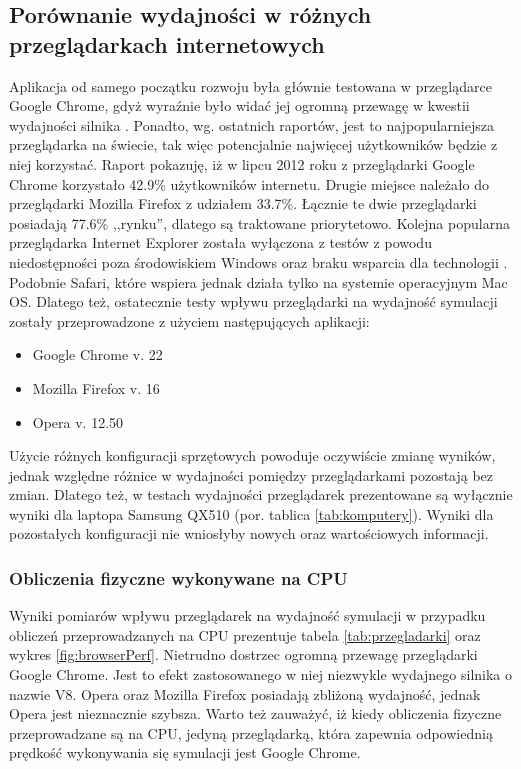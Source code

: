 \subsection{Porównanie wydajności w różnych przeglądarkach internetowych}
\label{sec:przegladarkiWyd}

Aplikacja od samego początku rozwoju była głównie testowana w przeglądarce
Google Chrome, gdyż wyraźnie było widać jej ogromną przewagę w kwestii
wydajności silnika \js. Ponadto, wg. ostatnich raportów, jest to
najpopularniejsza przeglądarka na świecie, tak więc potencjalnie najwięcej
użytkowników \en będzie z niej korzystać. Raport \cite{BrowserStats} pokazuję,
iż w lipcu 2012 roku z przeglądarki Google Chrome korzystało 42.9\%
użytkowników internetu. Drugie miejsce należało do przeglądarki Mozilla
Firefox z udziałem 33.7\%. Łącznie te dwie przeglądarki posiadają 77.6\%
,,rynku'', dlatego są traktowane priorytetowo. Kolejna popularna przeglądarka
Internet Explorer została wyłączona z testów z powodu niedostępności poza
środowiskiem Windows oraz braku wsparcia dla technologii . Podobnie
Safari, które wspiera  jednak działa tylko na systemie operacyjnym
Mac OS. Dlatego też, ostatecznie testy wpływu przeglądarki na wydajność
symulacji zostały przeprowadzone z użyciem następujących aplikacji:

\begin{itemize}
\item Google Chrome v. 22
\item Mozilla Firefox v. 16
\item Opera v. 12.50
\end{itemize}

Użycie różnych konfiguracji sprzętowych powoduje oczywiście zmianę wyników,
jednak względne różnice w wydajności pomiędzy przeglądarkami pozostają bez
zmian. Dlatego też, w testach wydajności przeglądarek prezentowane są
wyłącznie wyniki dla laptopa Samsung QX510 (por. tablica \ref{tab:komputery}).
Wyniki dla pozostałych konfiguracji nie wniosłyby nowych oraz wartościowych
informacji.

\subsubsection{Obliczenia fizyczne wykonywane na CPU}

Wyniki pomiarów wpływu przeglądarek na wydajność symulacji w przypadku
obliczeń przeprowadzanych na CPU prezentuje tabela \ref{tab:przegladarki} oraz
wykres \ref{fig:browserPerf}. Nietrudno dostrzec ogromną przewagę przeglądarki
Google Chrome. Jest to efekt zastosowanego w niej niezwykle wydajnego silnika
 o nazwie V8. Opera oraz Mozilla Firefox posiadają zbliżoną
wydajność, jednak Opera jest nieznacznie szybsza. Warto też zauważyć, iż kiedy
obliczenia fizyczne przeprowadzane są na CPU, jedyną przeglądarką, która
zapewnia odpowiednią prędkość wykonywania się symulacji jest Google Chrome.

